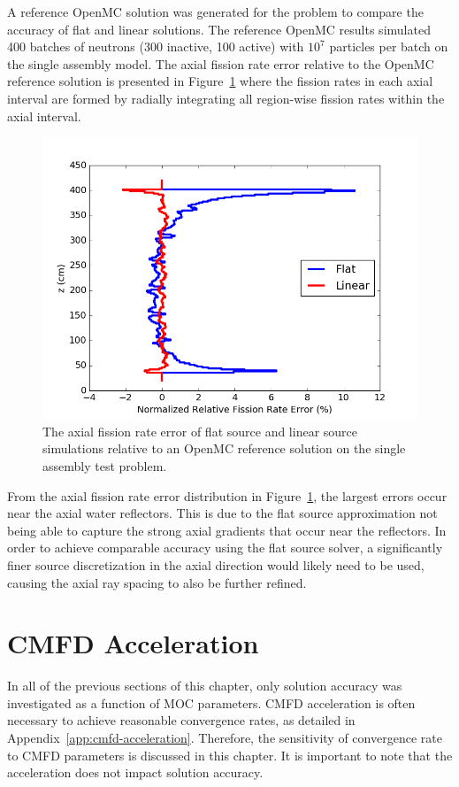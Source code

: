A reference OpenMC solution was generated for the problem to compare the accuracy of flat and linear solutions. The reference OpenMC results simulated 400 batches of neutrons (300 inactive, 100 active) with $10^7$ particles per batch on the single assembly model. The axial fission rate error relative to the OpenMC reference solution is presented in Figure~\ref{fig:fs-ls-axial-error} where the fission rates in each axial interval are formed by radially integrating all region-wise fission rates within the axial interval.

\begin{figure}[h!]
	\centering
	\includegraphics[width=0.7\linewidth]{figures/results/error-plots/sa_fs_ls_axial_error.png}
	\caption[]{The axial fission rate error of flat source and linear source simulations relative to an OpenMC reference solution on the single assembly test problem.}
	\label{fig:fs-ls-axial-error}
\end{figure}

From the axial fission rate error distribution in Figure~\ref{fig:fs-ls-axial-error}, the largest errors occur near the axial water reflectors. This is due to the flat source approximation not being able to capture the strong axial gradients that occur near the reflectors. In order to achieve comparable accuracy using the flat source solver, a significantly finer source discretization in the axial direction would likely need to be used, causing the axial ray spacing to also be further refined. 

\section{CMFD Acceleration}
\label{sec:cmfd-convergence-params}

In all of the previous sections of this chapter, only solution accuracy was investigated as a function of \ac{MOC} parameters. \ac{CMFD} acceleration is often necessary to achieve reasonable convergence rates, as detailed in Appendix~\ref{app:cmfd-acceleration}. Therefore, the sensitivity of convergence rate to \ac{CMFD} parameters is discussed in this chapter. It is important to note that the acceleration does not impact solution accuracy.

